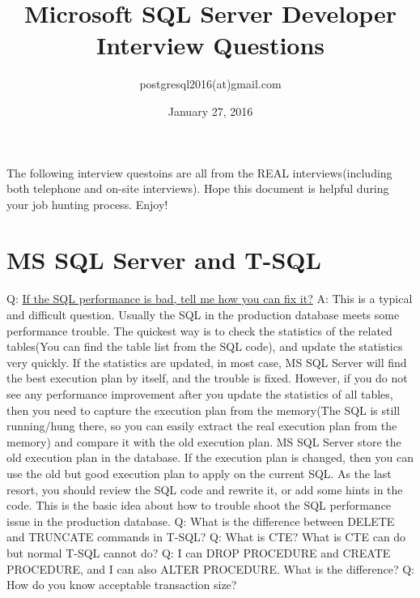 \documentclass[a4paper,11pt]{article}
\begin{document}
\title{Microsoft SQL Server Developer Interview Questions}
\author{postgresql2016(at)gmail.com}
\date{January 27, 2016}
\maketitle
The following interview questoins are all from the REAL interviews(including both telephone and on-site interviews). Hope this document is helpful during your job hunting process. Enjoy!
\section{MS SQL Server and T-SQL}
Q: \underline{If the SQL performance is bad, tell me how you can fix it?} \newline
A: This is a typical and difficult question. Usually the SQL in the production database meets some performance trouble. The quickest way is to check the statistics of the related tables(You can find the table list from the SQL code), and update the statistics very quickly. If the statistics are updated, in most case, MS SQL Server will find the best execution plan by itself, and the trouble is fixed. However, if you do not see any performance improvement after you update the statistics of all tables, then you need to capture the execution plan from the memory(The SQL is still running/hung there, so you can easily extract the real execution plan from the memory) and compare it with the old execution plan. MS SQL Server store the old execution plan in the database. If the execution plan is changed, then you can use the old but good execution plan to apply on the current SQL. As the last resort, you should review the SQL code and rewrite it, or add some hints in the code. This is the basic idea about how to trouble shoot the SQL performance issue in the production database.\newline \newline
\noindent 
Q: What is the difference between DELETE and TRUNCATE commands in T-SQL? \newline \newline
\noindent 
Q: What is CTE? What is CTE can do but normal T-SQL cannot do?\newline \newline
\noindent 
Q: I can DROP PROCEDURE and CREATE PROCEDURE, and I can also ALTER PROCEDURE. What is the difference? \newline \newline
\noindent 
Q: How do you know acceptable transaction size? \newline \newline
\end{document}

